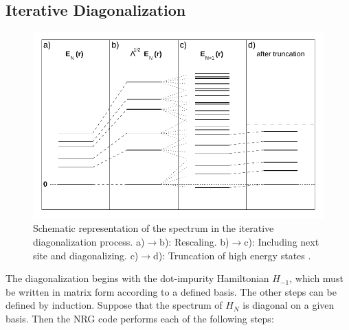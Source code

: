  \subsection{Iterative Diagonalization \label{subsec:IterativeDiag}}

\begin{figure}[bt]
\centering
\includegraphics[scale=0.5]{IMAGES/DQD/cutting.png}
\caption{ \label{fig:IterativeDiagonalization} Schematic representation of the spectrum in the iterative diagonalization process. a)$\rightarrow$b): Rescaling. b)$\rightarrow$c): Including next site and diagonalizing. c)$\rightarrow$d): Truncation of high energy states . \protect{} }
\end{figure}


 The diagonalization begins with the dot-impurity Hamiltonian $H_{-1}$, which must be written in matrix form according to a defined basis. The other steps can be defined by induction.  Suppose that the spectrum of $H_{N}$ is diagonal on a given basis. Then the NRG code performs each of the following steps:


